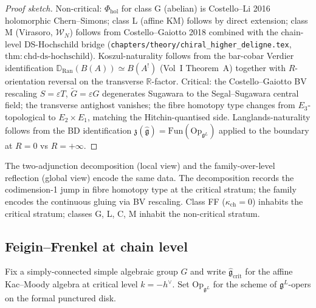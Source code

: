 \documentclass[11pt]{article}
\begin{document}
\begin{proof}[Proof sketch]
Non-critical: $\Phi_{\mathrm{hol}}$ for class G (abelian) is
Costello--Li 2016 holomorphic Chern--Simons; class L (affine KM)
follows by direct extension; class M (Virasoro, $\mathcal{W}_N$)
follows from Costello--Gaiotto 2018 combined with the chain-level
DS-Hochschild bridge (\texttt{chapters/theory/chiral\_higher\_deligne.tex},
$\mathrm{thm:chd\text{-}ds\text{-}hochschild}$). Koszul-naturality
follows from the bar-cobar Verdier identification
$\mathbb{D}_{\mathrm{Ran}}(B(A)) \simeq B(A^!)$ (Vol~I Theorem~A)
together with $R$-orientation reversal on the transverse $\mathbb{R}$-factor.
Critical: the Costello--Gaiotto BV rescaling $S = \varepsilon T$,
$\widetilde G = \varepsilon G$ degenerates Sugawara to the
Segal--Sugawara central field; the transverse antighost vanishes;
the fibre homotopy type changes from $E_3$-topological to
$E_2 \times E_1$, matching the Hitchin-quantised side.
Langlands-naturality follows from the BD identification
$\mathfrak{z}(\widehat{\mathfrak{g}}) = \mathrm{Fun}(\mathrm{Op}_{\mathfrak{g}^L})$
applied to the boundary at $R = 0$ vs $R = +\infty$.
\end{proof}

\begin{remark}
The two-adjunction decomposition (local view) and the family-over-level
reflection (global view) encode the same data. The decomposition
records the codimension-1 jump in fibre homotopy type at the
critical stratum; the family encodes the continuous gluing via BV
rescaling. Class FF ($\kappa_{\mathrm{ch}} = 0$) inhabits the
critical stratum; classes G, L, C, M inhabit the non-critical
stratum.
\end{remark}

\subsection{Feigin--Frenkel at chain level}
\label{subsec:ff-chain-level}

Fix a simply-connected simple algebraic group $G$ and write
$\widehat{\mathfrak{g}}_{\mathrm{crit}}$ for the affine Kac--Moody
algebra at critical level $k = -h^{\vee}$. Set
$\mathrm{Op}_{\mathfrak{g}^L}$ for the scheme of $\mathfrak{g}^L$-opers
on the formal punctured disk.
\end{document}
